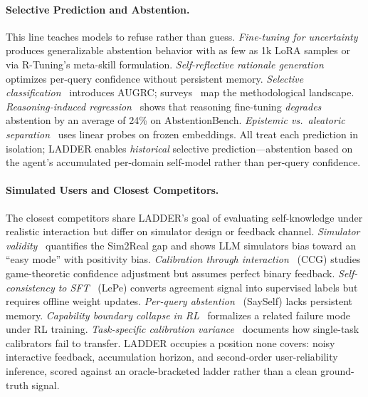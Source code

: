 \documentclass[11pt]{article}
\begin{document}
\paragraph{Selective Prediction and Abstention.}
This line teaches models to refuse rather than guess. \emph{Fine-tuning for uncertainty}~\citep{kapoor2024taught, diao2024rtuning} produces generalizable abstention behavior with as few as 1k LoRA samples or via R-Tuning's meta-skill formulation. \emph{Self-reflective rationale generation}~\citep{xu2024sayself} optimizes per-query confidence without persistent memory. \emph{Selective classification}~\citep{traub2024augrc} introduces AUGRC; surveys~\citep{li2025abstention} map the methodological landscape. \emph{Reasoning-induced regression}~\citep{kirichenko2025abstentionbench} shows that reasoning fine-tuning \emph{degrades} abstention by an average of 24\% on AbstentionBench. \emph{Epistemic vs.\ aleatoric separation}~\citep{ahdritz2024knowable} uses linear probes on frozen embeddings. All treat each prediction in isolation; LADDER enables \emph{historical} selective prediction---abstention based on the agent's accumulated per-domain self-model rather than per-query confidence.

\paragraph{Simulated Users and Closest Competitors.}
The closest competitors share LADDER's goal of evaluating self-knowledge under realistic interaction but differ on simulator design or feedback channel. \emph{Simulator validity}~\citep{zhou2026sim2real} quantifies the Sim2Real gap and shows LLM simulators bias toward an ``easy mode'' with positivity bias. \emph{Calibration through interaction}~\citep{fang2025ccg} (CCG) studies game-theoretic confidence adjustment but assumes perfect binary feedback. \emph{Self-consistency to SFT}~\citep{han2024lepe} (LePe) converts agreement signal into supervised labels but requires offline weight updates. \emph{Per-query abstention}~\citep{xu2024sayself} (SaySelf) lacks persistent memory. \emph{Capability boundary collapse in RL}~\citep{dong2025rlplus} formalizes a related failure mode under RL training. \emph{Task-specific calibration variance}~\citep{shen2024thermometer, chen2024reconfidencing, manggala2025qacal} documents how single-task calibrators fail to transfer. LADDER occupies a position none covers: noisy interactive feedback, accumulation horizon, and second-order user-reliability inference, scored against an oracle-bracketed ladder rather than a clean ground-truth signal.
\end{document}
